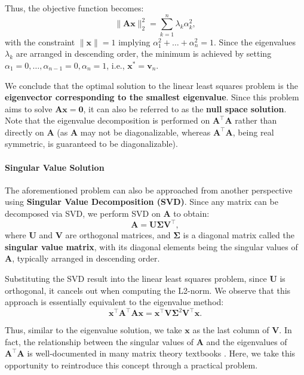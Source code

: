 Thus, the objective function becomes:
\begin{equation}\label{key}
	\| \mathbf{A} \mathbf{x} \|_2^2 = \sum_{k=1}^{n} \lambda_k \alpha_k^2,
\end{equation}
with the constraint $\| \mathbf{x} \| = 1$ implying $\alpha_1^2 + \ldots + \alpha_n^2 = 1$. Since the eigenvalues $\lambda_k$ are arranged in descending order, the minimum is achieved by setting $\alpha_1 = 0, \ldots, \alpha_{n-1} = 0, \alpha_n = 1$, i.e., $\mathbf{x}^* = \mathbf{v}_n$.

We conclude that the optimal solution to the linear least squares problem is the \textbf{eigenvector corresponding to the smallest eigenvalue}. Since this problem aims to solve $\mathbf{A} \mathbf{x} = \mathbf{0}$, it can also be referred to as the \textbf{null space solution}. Note that the eigenvalue decomposition is performed on $\mathbf{A}^\top \mathbf{A}$ rather than directly on $\mathbf{A}$ (as $\mathbf{A}$ may not be diagonalizable, whereas $\mathbf{A}^\top \mathbf{A}$, being real symmetric, is guaranteed to be diagonalizable).

\paragraph{Singular Value Solution}
The aforementioned problem can also be approached from another perspective using \textbf{Singular Value Decomposition (SVD)}. Since any matrix can be decomposed via SVD, we perform SVD on $\mathbf{A}$ to obtain:
\begin{equation}\label{key}
	\mathbf{A} = \mathbf{U} \boldsymbol{\Sigma} \mathbf{V}^\top,
\end{equation}
where $\mathbf{U}$ and $\mathbf{V}$ are orthogonal matrices, and $\boldsymbol{\Sigma}$ is a diagonal matrix called the \textbf{singular value matrix}, with its diagonal elements being the singular values of $\mathbf{A}$, typically arranged in descending order.  

Substituting the SVD result into the linear least squares problem, since $\mathbf{U}$ is orthogonal, it cancels out when computing the L2-norm. We observe that this approach is essentially equivalent to the eigenvalue method:
\begin{equation}\label{key}
	\mathbf{x}^\top \mathbf{A}^\top \mathbf{A} \mathbf{x} = \mathbf{x}^\top \mathbf{V} 
	\boldsymbol{\Sigma}^2 \mathbf{V}^\top \mathbf{x}.
\end{equation}

Thus, similar to the eigenvalue solution, we take $\mathbf{x}$ as the last column of $\mathbf{V}$. In fact, the relationship between the singular values of $\mathbf{A}$ and the eigenvalues of $\mathbf{A}^\top\mathbf{A}$ is well-documented in many matrix theory textbooks \cite{Magnus1998}. Here, we take this opportunity to reintroduce this concept through a practical problem.  

